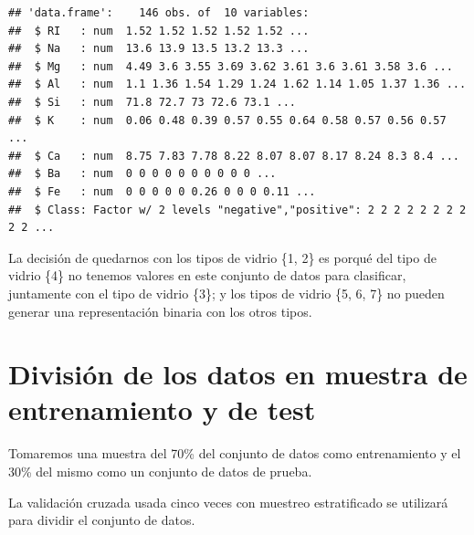 \documentclass[]{article}
\newenvironment{Shaded}{\begin{snugshade}}{\end{snugshade}}
\newcommand{\DataTypeTok}[1]{\textcolor[rgb]{0.13,0.29,0.53}{#1}}
\newcommand{\DecValTok}[1]{\textcolor[rgb]{0.00,0.00,0.81}{#1}}
\newcommand{\FloatTok}[1]{\textcolor[rgb]{0.00,0.00,0.81}{#1}}
\newcommand{\KeywordTok}[1]{\textcolor[rgb]{0.13,0.29,0.53}{\textbf{#1}}}
\newcommand{\NormalTok}[1]{#1}
\newcommand{\OperatorTok}[1]{\textcolor[rgb]{0.81,0.36,0.00}{\textbf{#1}}}
\newcommand{\OtherTok}[1]{\textcolor[rgb]{0.56,0.35,0.01}{#1}}
\newcommand{\StringTok}[1]{\textcolor[rgb]{0.31,0.60,0.02}{#1}}
\begin{document}
\begin{verbatim}
## 'data.frame':    146 obs. of  10 variables:
##  $ RI   : num  1.52 1.52 1.52 1.52 1.52 ...
##  $ Na   : num  13.6 13.9 13.5 13.2 13.3 ...
##  $ Mg   : num  4.49 3.6 3.55 3.69 3.62 3.61 3.6 3.61 3.58 3.6 ...
##  $ Al   : num  1.1 1.36 1.54 1.29 1.24 1.62 1.14 1.05 1.37 1.36 ...
##  $ Si   : num  71.8 72.7 73 72.6 73.1 ...
##  $ K    : num  0.06 0.48 0.39 0.57 0.55 0.64 0.58 0.57 0.56 0.57 ...
##  $ Ca   : num  8.75 7.83 7.78 8.22 8.07 8.07 8.17 8.24 8.3 8.4 ...
##  $ Ba   : num  0 0 0 0 0 0 0 0 0 0 ...
##  $ Fe   : num  0 0 0 0 0 0.26 0 0 0 0.11 ...
##  $ Class: Factor w/ 2 levels "negative","positive": 2 2 2 2 2 2 2 2 2 2 ...
\end{verbatim}

La decisión de quedarnos con los tipos de vidrio \{1, 2\} es porqué del tipo de vidrio \{4\} no tenemos valores en este conjunto de datos para clasificar, juntamente con el tipo de vidrio \{3\}; y los tipos de vidrio \{5, 6, 7\} no pueden generar una representación binaria con los otros tipos.

\hypertarget{divisiuxf3n-de-los-datos-en-muestra-de-entrenamiento-y-de-test}{%
\section{División de los datos en muestra de entrenamiento y de
test}\label{divisiuxf3n-de-los-datos-en-muestra-de-entrenamiento-y-de-test}}

Tomaremos una muestra del 70\% del conjunto de datos como entrenamiento y el 30\% del mismo como un conjunto de datos de prueba.

La validación cruzada usada cinco veces con muestreo estratificado se utilizará para dividir el conjunto de datos.

\begin{Shaded}
\end{Shaded}
\end{document}
